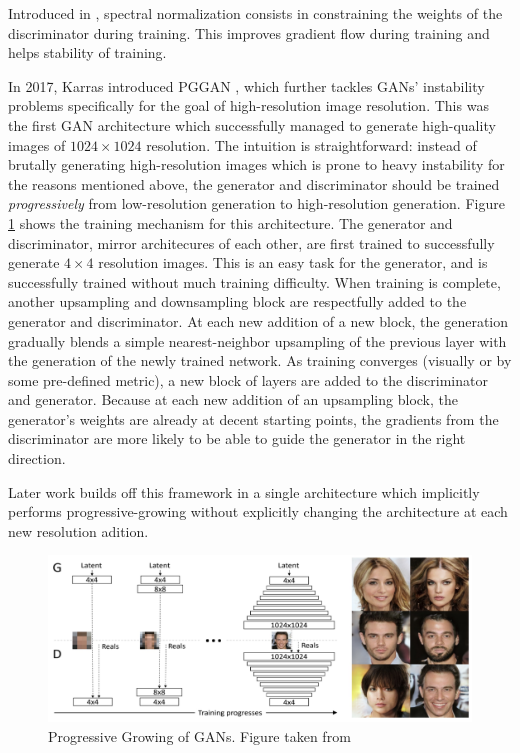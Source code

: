   Introduced in \cite{miyato2018spectral}, spectral normalization 
 consists in constraining the weights of the discriminator during training. This improves 
 gradient flow during training and helps stability of training.

\label{par:progressive_growing}
In 2017, Karras introduced \ac{PGGAN} \citep{karras2018progressive}, which further tackles GANs' instability problems 
specifically for the goal of high-resolution image resolution. This was the first GAN architecture which successfully 
managed to generate high-quality images of $1024 \times 1024$ resolution. The intuition is straightforward: instead 
of brutally generating high-resolution images which is prone to heavy instability for the reasons mentioned above,
 the generator and discriminator should be trained 
\emph{progressively} from low-resolution generation to high-resolution generation. Figure \ref{fig:pgan}
shows the training mechanism for this architecture.
 The generator and discriminator, mirror architecures of 
each other, are first trained to successfully generate $4 \times 4$ resolution images. This is an easy 
task for the generator, and is successfully trained without much training difficulty. When training is 
complete, another upsampling and downsampling block are respectfully added to the 
generator and discriminator. 
At each new addition of a new block, the generation gradually blends a simple nearest-neighbor 
upsampling of the previous layer with the generation of the newly trained network. As training converges (visually or 
by some pre-defined metric), a new block of layers are added to the discriminator and generator. Because at each new 
addition of an upsampling block, the generator's weights are already at decent starting points, 
the gradients from the discriminator are more likely to be able to guide the generator in the right direction.

Later work \citep{karnewar2020msg, karra2020stylegan2} builds off this framework in a single 
architecture which implicitly performs progressive-growing without explicitly changing the architecture at each new 
resolution adition. 

\begin{figure}[tb]
      \begin{center}
          \includegraphics[width=0.7\linewidth]{images/magec/pgan.jpg}
      \end{center}
      \caption{Progressive Growing of GANs. Figure taken from \cite{karras2018progressive}}
      \label{fig:pgan}
  \end{figure}
  

